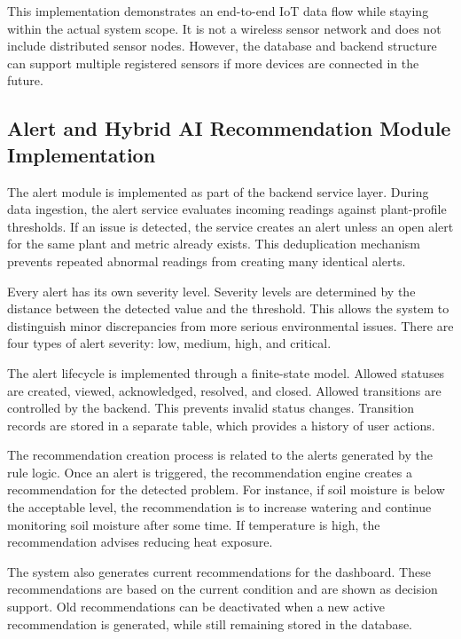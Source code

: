 This implementation demonstrates an end-to-end IoT data flow while staying within the actual system scope. It is not a wireless sensor network and does not include distributed sensor nodes. However, the database and backend structure can support multiple registered sensors if more devices are connected in the future.

\subsection{Alert and Hybrid AI Recommendation Module Implementation}
\label{subsec:alert-hybrid-ai-recommendation-implementation}

The alert module is implemented as part of the backend service layer. During data ingestion, the alert service evaluates incoming readings against plant-profile thresholds. If an issue is detected, the service creates an alert unless an open alert for the same plant and metric already exists. This deduplication mechanism prevents repeated abnormal readings from creating many identical alerts.

Every alert has its own severity level. Severity levels are determined by the distance between the detected value and the threshold. This allows the system to distinguish minor discrepancies from more serious environmental issues. There are four types of alert severity: low, medium, high, and critical.

The alert lifecycle is implemented through a finite-state model. Allowed statuses are created, viewed, acknowledged, resolved, and closed. Allowed transitions are controlled by the backend. This prevents invalid status changes. Transition records are stored in a separate table, which provides a history of user actions.

The recommendation creation process is related to the alerts generated by the rule logic. Once an alert is triggered, the recommendation engine creates a recommendation for the detected problem. For instance, if soil moisture is below the acceptable level, the recommendation is to increase watering and continue monitoring soil moisture after some time. If temperature is high, the recommendation advises reducing heat exposure.

The system also generates current recommendations for the dashboard. These recommendations are based on the current condition and are shown as decision support. Old recommendations can be deactivated when a new active recommendation is generated, while still remaining stored in the database.

